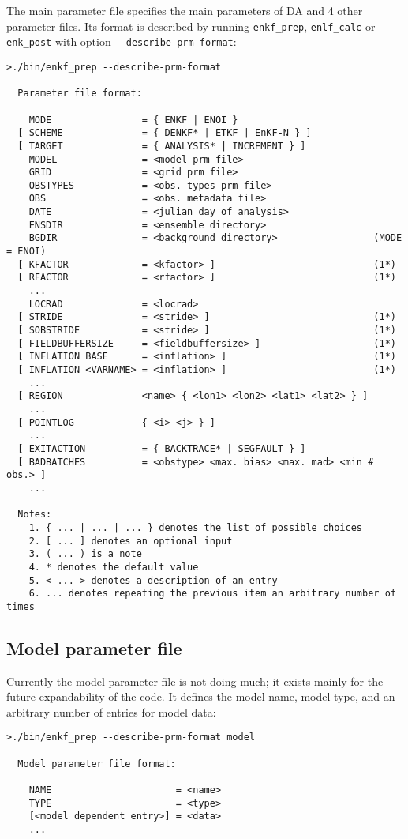 \documentclass[11pt]{report}
\begin{document}
The main parameter file specifies the main parameters of DA and 4 other parameter files.
Its format is described by running \verb|enkf_prep|, \verb|enlf_calc| or \verb|enk_post| with option \verb|--describe-prm-format|:
\begin{Verbatim}[frame=single,fontsize=\footnotesize]
>./bin/enkf_prep --describe-prm-format

  Parameter file format:

    MODE                = { ENKF | ENOI }
  [ SCHEME              = { DENKF* | ETKF | EnKF-N } ]
  [ TARGET              = { ANALYSIS* | INCREMENT } ]
    MODEL               = <model prm file>
    GRID                = <grid prm file>
    OBSTYPES            = <obs. types prm file>
    OBS                 = <obs. metadata file>
    DATE                = <julian day of analysis>
    ENSDIR              = <ensemble directory>
    BGDIR               = <background directory>                 (MODE = ENOI)
  [ KFACTOR             = <kfactor> ]                            (1*)
  [ RFACTOR             = <rfactor> ]                            (1*)
    ...
    LOCRAD              = <locrad>
  [ STRIDE              = <stride> ]                             (1*)
  [ SOBSTRIDE           = <stride> ]                             (1*)
  [ FIELDBUFFERSIZE     = <fieldbuffersize> ]                    (1*)
  [ INFLATION BASE      = <inflation> ]                          (1*)
  [ INFLATION <VARNAME> = <inflation> ]                          (1*)
    ...
  [ REGION              <name> { <lon1> <lon2> <lat1> <lat2> } ]
    ...
  [ POINTLOG            { <i> <j> } ]
    ...
  [ EXITACTION          = { BACKTRACE* | SEGFAULT } ]
  [ BADBATCHES          = <obstype> <max. bias> <max. mad> <min # obs.> ]
    ...

  Notes:
    1. { ... | ... | ... } denotes the list of possible choices
    2. [ ... ] denotes an optional input
    3. ( ... ) is a note
    4. * denotes the default value
    5. < ... > denotes a description of an entry
    6. ... denotes repeating the previous item an arbitrary number of times
\end{Verbatim}

\subsection{Model parameter file}

Currently the model parameter file is not doing much; it exists mainly for the future expandability of the code. 
It defines the model name, model type, and an arbitrary number of entries for model data:
\begin{Verbatim}[frame=single,fontsize=\footnotesize]
>./bin/enkf_prep --describe-prm-format model

  Model parameter file format:

    NAME                      = <name>
    TYPE                      = <type>
    [<model dependent entry>] = <data>
    ...
\end{Verbatim}
\end{document}
